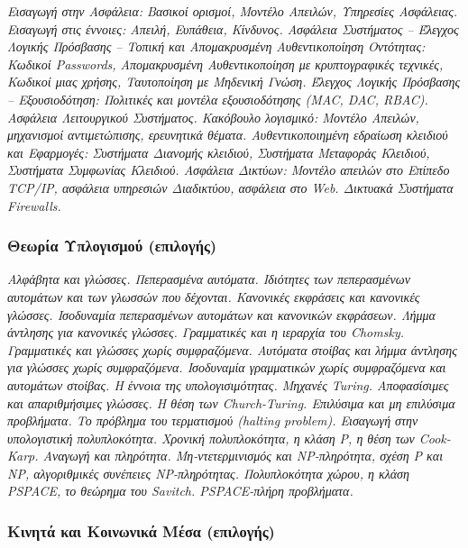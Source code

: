 \emph{Εισαγωγή στην Ασφάλεια: Βασικοί ορισμοί, Μοντέλο Απειλών,
Υπηρεσίες Ασφάλειας. Εισαγωγή στις έννοιες: Απειλή, Ευπάθεια, Κίνδυνος.
Ασφάλεια Συστήματος -- Έλεγχος Λογικής Πρόσβασης -- Τοπική και
Απομακρυσμένη Αυθεντικοποίηση Οντότητας: Κωδικοί Passwords,
Απομακρυσμένη Αυθεντικοποίηση με κρυπτογραφικές τεχνικές, Κωδικοί μιας
χρήσης, Ταυτοποίηση με Μηδενική Γνώση. Έλεγχος Λογικής Πρόσβασης --
Εξουσιοδότηση: Πολιτικές και μοντέλα εξουσιοδότησης (MAC, DAC, RBAC).
Ασφάλεια Λειτουργικού Συστήματος. Κακόβουλο λογισμικό: Μοντέλο Απειλών,
μηχανισμοί αντιμετώπισης, ερευνητικά θέματα. Αυθεντικοποιημένη εδραίωση
κλειδιού και Εφαρμογές: Συστήματα Διανομής κλειδιού, Συστήματα Μεταφοράς
Κλειδιού, Συστήματα Συμφωνίας Κλειδιού. Ασφάλεια Δικτύων: Μοντέλο
απειλών στο Επίπεδο TCP/IP, ασφάλεια υπηρεσιών Διαδικτύου, ασφάλεια στο
Web. Δικτυακά Συστήματα Firewalls.}

\hypertarget{ux3b8ux3b5ux3c9ux3c1ux3afux3b1-ux3c5ux3c0ux3bbux3bfux3b3ux3b9ux3c3ux3bcux3bfux3cd-ux3b5ux3c0ux3b9ux3bbux3bfux3b3ux3aeux3c2}{%
\subsubsection{Θεωρία Υπλογισμού
(επιλογής)}\label{ux3b8ux3b5ux3c9ux3c1ux3afux3b1-ux3c5ux3c0ux3bbux3bfux3b3ux3b9ux3c3ux3bcux3bfux3cd-ux3b5ux3c0ux3b9ux3bbux3bfux3b3ux3aeux3c2}}

\emph{Αλφάβητα και γλώσσες. Πεπερασμένα αυτόματα. Ιδιότητες των
πεπερασμένων αυτομάτων και των γλωσσών που δέχονται. Κανονικές εκφράσεις
και κανονικές γλώσσες. Ισοδυναμία πεπερασμένων αυτομάτων και κανονικών
εκφράσεων. Λήμμα άντλησης για κανονικές γλώσσες. Γραμματικές και η
ιεραρχία του Chomsky. Γραμματικές και γλώσσες χωρίς συμφραζόμενα.
Αυτόματα στοίβας και λήμμα άντλησης για γλώσσες χωρίς συμφραζόμενα.
Ισοδυναμία γραμματικών χωρίς συμφραζόμενα και αυτομάτων στοίβας. Η
έννοια της υπολογισιμότητας. Mηχανές Turing. Aποφασίσιμες και
απαριθμήσιμες γλώσσες. Η θέση των Church-Turing. Eπιλύσιμα και μη
επιλύσιμα προβλήματα. Το πρόβλημα του τερματισμού (halting problem).
Εισαγωγή στην υπολογιστική πολυπλοκότητα. Χρονική πολυπλοκότητα, η κλάση
Ρ, η θέση των Cook-Karp. Αναγωγή και πληρότητα. Μη-ντετερμινισμός και
NP-πληρότητα, σχέση Ρ και ΝΡ, αλγοριθμικές συνέπειες NP-πληρότητας.
Πολυπλοκότητα χώρου, η κλάση PSPACE, το θεώρημα του Savitch.
PSPACE-πλήρη προβλήματα.}

\hypertarget{ux3baux3b9ux3bdux3b7ux3c4ux3ac-ux3baux3b1ux3b9-ux3baux3bfux3b9ux3bdux3c9ux3bdux3b9ux3baux3ac-ux3bcux3adux3c3ux3b1-ux3b5ux3c0ux3b9ux3bbux3bfux3b3ux3aeux3c2}{%
\subsubsection{Κινητά και Κοινωνικά Μέσα
(επιλογής)}\label{ux3baux3b9ux3bdux3b7ux3c4ux3ac-ux3baux3b1ux3b9-ux3baux3bfux3b9ux3bdux3c9ux3bdux3b9ux3baux3ac-ux3bcux3adux3c3ux3b1-ux3b5ux3c0ux3b9ux3bbux3bfux3b3ux3aeux3c2}}

